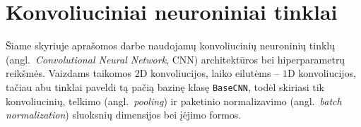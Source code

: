 \section{Konvoliuciniai neuroniniai tinklai}
\label{sec:konvoliuciniai_neuroniniai_tinklai}

Šiame skyriuje aprašomos darbe naudojamų konvoliucinių neuroninių tinklų (angl.~\textit{Convolutional Neural Network}, CNN) architektūros bei hiperparametrų reikšmės. Vaizdams taikomos $2$D konvoliucijos, laiko eilutėms – $1$D konvoliucijos, tačiau abu tinklai paveldi tą pačią bazinę klasę \texttt{BaseCNN}, todėl skiriasi tik konvoliucinių, telkimo (angl.~\textit{pooling}) ir paketinio normalizavimo (angl.~\textit{batch normalization}) sluoksnių dimensijos bei įėjimo formos.



